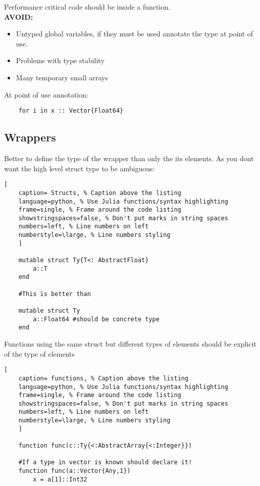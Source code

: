 \documentclass[11pt]{scrartcl} %
\begin{document}
Performance critical code should be inside a function.\\

\textbf{AVOID:}
\begin{itemize}
	\item Untyped global variables, if they must be used annotate the type at point of use.
	\item Problems with type stability
	\item Many temporary small arrays
\end{itemize}

At point of use annotation:
\begin{verbatim}
	for i in x :: Vector{Float64}
\end{verbatim}

\subsection{Wrappers}

Better to define the type of the wrapper than only the its elements. As you dont want the high
level struct type to be ambiguous:

\begin{lstlisting}[
	caption= Structs, % Caption above the listing
	language=python, % Use Julia functions/syntax highlighting
	frame=single, % Frame around the code listing
	showstringspaces=false, % Don't put marks in string spaces
	numbers=left, % Line numbers on left
	numberstyle=\large, % Line numbers styling
	]

	mutable struct Ty{T<: AbstractFloat}
		a::T
	end

	#This is better than

	mutable struct Ty
		a::Float64 #should be concrete type
	end

\end{lstlisting}

Functions using the same struct but different types of elements should be explicit of the
type of elements

\begin{lstlisting}[
	caption= functions, % Caption above the listing
	language=python, % Use Julia functions/syntax highlighting
	frame=single, % Frame around the code listing
	showstringspaces=false, % Don't put marks in string spaces
	numbers=left, % Line numbers on left
	numberstyle=\large, % Line numbers styling
	]

	function func(c::Ty{<:AbstractArray{<:Integer}})

	#If a type in vector is known should declare it!
	function func(a::Vector{Any,1})
		x = a[1]::Int32


\end{lstlisting}
\end{document}
